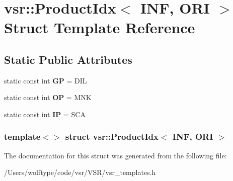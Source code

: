 \hypertarget{structvsr_1_1_product_idx_3_01_i_n_f_00_01_o_r_i_01_4}{\section{vsr\-:\-:Product\-Idx$<$ I\-N\-F, O\-R\-I $>$ Struct Template Reference}
\label{structvsr_1_1_product_idx_3_01_i_n_f_00_01_o_r_i_01_4}
}
\subsection*{Static Public Attributes}
\begin{DoxyCompactItemize}
\item 
\hypertarget{structvsr_1_1_product_idx_3_01_i_n_f_00_01_o_r_i_01_4_a15209016a682895edc2fc7b975e4d1f4}{static const int {\bfseries G\-P} = D\-I\-L}\label{structvsr_1_1_product_idx_3_01_i_n_f_00_01_o_r_i_01_4_a15209016a682895edc2fc7b975e4d1f4}

\item 
\hypertarget{structvsr_1_1_product_idx_3_01_i_n_f_00_01_o_r_i_01_4_a995a61b4da0cb9b7050fc12cf3ba1744}{static const int {\bfseries O\-P} = M\-N\-K}\label{structvsr_1_1_product_idx_3_01_i_n_f_00_01_o_r_i_01_4_a995a61b4da0cb9b7050fc12cf3ba1744}

\item 
\hypertarget{structvsr_1_1_product_idx_3_01_i_n_f_00_01_o_r_i_01_4_ae2f46524763b5059144d5c2254e440bd}{static const int {\bfseries I\-P} = S\-C\-A}\label{structvsr_1_1_product_idx_3_01_i_n_f_00_01_o_r_i_01_4_ae2f46524763b5059144d5c2254e440bd}

\end{DoxyCompactItemize}
\subsubsection*{template$<$$>$ struct vsr\-::\-Product\-Idx$<$ I\-N\-F, O\-R\-I $>$}



The documentation for this struct was generated from the following file\-:\begin{DoxyCompactItemize}
\item 
/\-Users/wolftype/code/vsr/\-V\-S\-R/vsr\-\_\-templates.\-h\end{DoxyCompactItemize}

